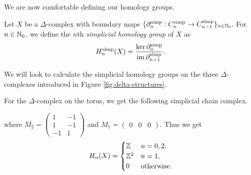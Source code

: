 We are now comfortable defining our homology groups.

\begin{definition}
  Let $X$ be a $\Delta$-complex with boundary maps $\{\partial_n^\text{simp}: C_n^\text{simp} \to C_{n-1}^\text{simp}\}_{n \in \mathbb{N}_0}$. For $n \in \mathbb{N}_0$, we define the $n$th \emph{simplicial homology group} of $X$ as
  \[ H_n^\text{simp}(X) = \frac{\ker\partial_n^\text{simp}}{\operatorname{im}\partial_{n+1}^\text{simp}}. \]
\end{definition}

We will look to calculate the simplicial homology groups on the three $\Delta$-com\-plex\-es introduced in Figure \ref{fig:delta-structures}.

\begin{example}
   For the $\Delta$-complex on the torus, we get the following simplicial chain complex.
  \begin{center}
  \end{center}
  where
  $
    M_2 =
    \begin{pmatrix}
      1 & -1 \\ 1 & -1 \\ -1 & 1
    \end{pmatrix}
  $
  and
  $
    M_1 =
    \begin{pmatrix}
      0 & 0 & 0
    \end{pmatrix}
  $.
  Thus we get
  \[
    H_n(X) =
    \begin{cases}
      \mathbb{Z}   & n = 0, 2,         \\
      \mathbb{Z}^2 & n = 1,            \\
      0    & \text{otherwise}.
    \end{cases}
  \]
  \end{example}


